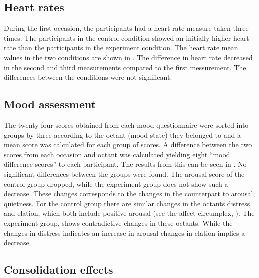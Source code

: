\subsection{Heart rates}

During the first occasion, the participants had a heart rate measure
taken three times. The participants in the control condition showed an
initially higher heart rate than the participants in the experiment
condition. The heart rate mean values in the two conditions are shown
in .  The difference in heart rate
decreased in the second and third measurements compared to the first
messurement.  The differences between the conditions were not
significant.





\subsection{Mood assessment}

The twenty-four scores obtained from each mood questionnaire  were
sorted into groups by three according to the octant (mood state) they
belonged to and a mean score was calculated for each group of scores.
A difference between the two scores from each occasion and octant was
calculated yielding eight ``mood difference scores'' to each
participant.  The results from this can be seen in
.  No significant differences between the groups
were found.  The arousal score of the control group dropped, while the
experiment group does not show such a decrease. These changes
corresponds to the changes in the counterpart to arousal, quietness.
For the control group there are similar changes in the octants
distress and elation, which both include positive arousal (see the
affect circumplex, ). The experiment group,
shows contradictive changes in these octants. While the changes in
distress indicates an increase in arousal changes in elation implies a
decrease.







\subsection{Consolidation effects}


